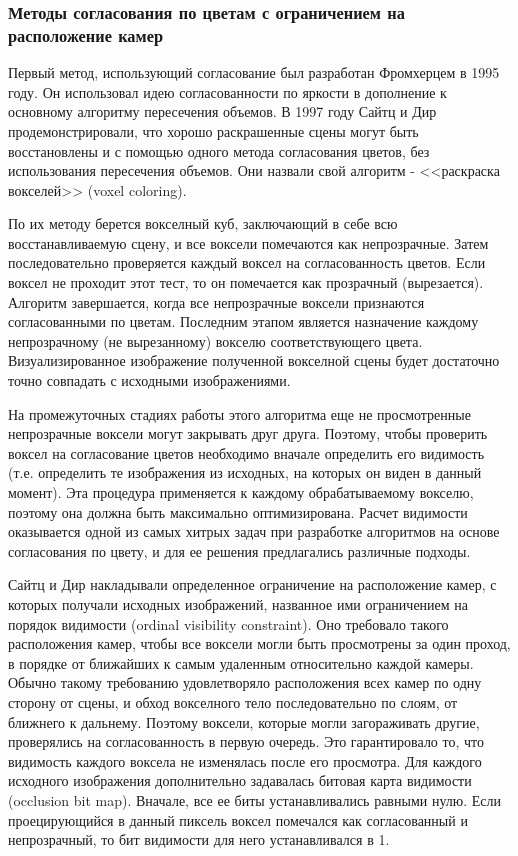 \subsubsection{Методы согласования по цветам с ограничением на расположение камер}
Первый метод, использующий согласование был разработан Фромхерцем в 1995 году. Он использовал идею согласованности по яркости в дополнение к основному алгоритму пересечения объемов. В 1997 году Сайтц и Дир продемонстрировали, что хорошо раскрашенные сцены могут быть восстановлены и с помощью одного метода согласования цветов, без использования пересечения объемов. Они назвали свой алгоритм - <<раскраска вокселей>> (voxel coloring).

По их методу берется вокселный куб, заключающий в себе всю восстанавливаемую сцену, и все воксели помечаются как непрозрачные. Затем последовательно проверяется каждый воксел на согласованность цветов. Если воксел не проходит этот тест, то он помечается как прозрачный (вырезается). Алгоритм завершается, когда все непрозрачные воксели признаются согласованными по цветам. Последним этапом является назначение каждому непрозрачному (не вырезанному) вокселю соответствующего цвета. Визуализированное изображение полученной вокселной сцены будет достаточно точно совпадать с исходными изображениями.

На промежуточных стадиях работы этого алгоритма еще не просмотренные непрозрачные воксели могут закрывать друг друга. Поэтому, чтобы проверить воксел на согласование цветов необходимо вначале определить его видимость (т.е. определить те изображения из исходных, на которых он виден в данный момент). Эта процедура применяется к каждому обрабатываемому вокселю, поэтому она должна быть максимально оптимизирована. Расчет видимости оказывается одной из самых хитрых задач при разработке алгоритмов на основе согласования по цвету, и для ее решения предлагались различные подходы.

Сайтц и Дир накладывали определенное ограничение на расположение камер, с которых получали исходных изображений, названное ими ограничением на порядок видимости (ordinal visibility constraint). Оно требовало такого расположения камер, чтобы все воксели могли быть просмотрены за один проход, в порядке от ближайших к самым удаленным относительно каждой камеры. Обычно такому требованию удовлетворяло расположения всех камер по одну сторону от сцены, и обход вокселного тело последовательно по слоям, от ближнего к дальнему. Поэтому воксели, которые могли загораживать другие, проверялись на согласованность в первую очередь. Это гарантировало то, что видимость каждого воксела не изменялась после его просмотра. Для каждого исходного изображения дополнительно задавалась битовая карта видимости (occlusion bit map). Вначале, все ее биты устанавливались равными нулю. Если проецирующийся в данный пиксель воксел помечался как согласованный и непрозрачный, то бит видимости для него устанавливался в 1.

